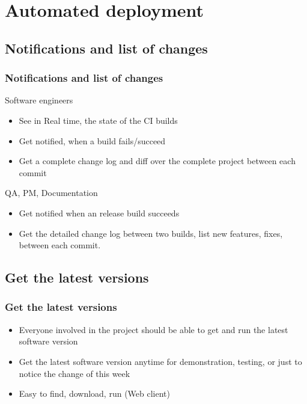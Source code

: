 \documentclass{beamer}
\begin{document}
\section[Automated deployment]{Automated deployment}
\subsection[Notifications and list of changes]{Notifications and list of
changes}
\begin{frame}
\frametitle{Notifications and list of changes}
{
\begin{block}{Software engineers}
   \begin{itemize}
     \item<1-> See in Real time, the state of the CI builds
     \item<2-> Get notified, when a build fails/succeed
     \item<3-> Get a complete change log and diff over the complete
     project between each commit
   \end{itemize}
 \end{block}
}
{
\begin{block}{QA, PM, Documentation}
   \begin{itemize}
     \item<4-> Get notified when an release build succeeds
     \item<5-> Get the detailed change log between two builds, list new
     features, fixes, between each commit.
   \end{itemize}
 \end{block}
}

\end{frame}

\subsection[Get the latest versions]{Get the latest versions}
\begin{frame}
\frametitle{Get the latest versions}

\begin{itemize}
  \item<1-> Everyone involved in the project should be able to get
  and run the latest software version
  \item<2-> Get the latest software version anytime for demonstration, testing,
  or just to notice the change of this week
  \item<3-> Easy to find, download, run (Web client) 
\end{itemize}

\end{frame}
\end{document}
